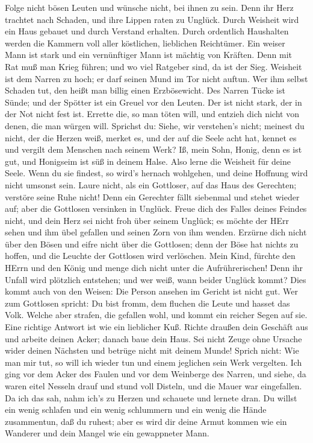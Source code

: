  Folge nicht bösen Leuten und wünsche nicht, bei ihnen zu
sein.  Denn ihr Herz trachtet nach Schaden, und ihre Lippen
raten zu Unglück.  Durch Weisheit wird ein Haus gebauet und
durch Verstand erhalten.  Durch ordentlich Haushalten werden
die Kammern voll aller köstlichen, lieblichen Reichtümer. 
Ein weiser Mann ist stark und ein vernünftiger Mann ist mächtig von
Kräften.  Denn mit Rat muß man Krieg führen; und wo viel
Ratgeber sind, da ist der Sieg.  Weisheit ist dem Narren zu
hoch; er darf seinen Mund im Tor nicht auftun.  Wer ihm
selbst Schaden tut, den heißt man billig einen Erzbösewicht.
 Des Narren Tücke ist Sünde; und der Spötter ist ein Greuel
vor den Leuten.  Der ist nicht stark, der in der Not nicht
fest ist.  Errette die, so man töten will, und entzieh dich
nicht von denen, die man würgen will.  Sprichst du: Siehe,
wir verstehen's nicht; meinest du nicht, der die Herzen weiß, merket es,
und der auf die Seele acht hat, kennet es und vergilt dem Menschen nach
seinem Werk?  Iß, mein Sohn, Honig, denn es ist gut, und
Honigseim ist süß in deinem Halse.  Also lerne die Weisheit
für deine Seele. Wenn du sie findest, so wird's hernach wohlgehen, und
deine Hoffnung wird nicht umsonst sein.  Laure nicht, als
ein Gottloser, auf das Haus des Gerechten; verstöre seine Ruhe nicht!
 Denn ein Gerechter fällt siebenmal und stehet wieder auf;
aber die Gottlosen versinken in Unglück.  Freue dich des
Falles deines Feindes nicht, und dein Herz sei nicht froh über seinem
Unglück;  es möchte der HErr sehen und ihm übel gefallen
und seinen Zorn von ihm wenden.  Erzürne dich nicht über
den Bösen und eifre nicht über die Gottlosen;  denn der
Böse hat nichts zu hoffen, und die Leuchte der Gottlosen wird
verlöschen.  Mein Kind, fürchte den HErrn und den König und
menge dich nicht unter die Aufrührerischen!  Denn ihr
Unfall wird plötzlich entstehen; und wer weiß, wann beider Unglück
kommt?  Dies kommt auch von den Weisen: Die Person ansehen
im Gericht ist nicht gut.  Wer zum Gottlosen spricht: Du
bist fromm, dem fluchen die Leute und hasset das Volk. 
Welche aber strafen, die gefallen wohl, und kommt ein reicher Segen auf
sie.  Eine richtige Antwort ist wie ein lieblicher Kuß.
 Richte draußen dein Geschäft aus und arbeite deinen Acker;
danach baue dein Haus.  Sei nicht Zeuge ohne Ursache wider
deinen Nächsten und betrüge nicht mit deinem Munde!  Sprich
nicht: Wie man mir tut, so will ich wieder tun und einem jeglichen sein
Werk vergelten.  Ich ging vor dem Acker des Faulen und vor
dem Weinberge des Narren,  und siehe, da waren eitel
Nesseln drauf und stund voll Disteln, und die Mauer war eingefallen.
 Da ich das sah, nahm ich's zu Herzen und schauete und
lernete dran.  Du willst ein wenig schlafen und ein wenig
schlummern und ein wenig die Hände zusammentun, daß du ruhest;
 aber es wird dir deine Armut kommen wie ein Wanderer und
dein Mangel wie ein gewappneter Mann.


